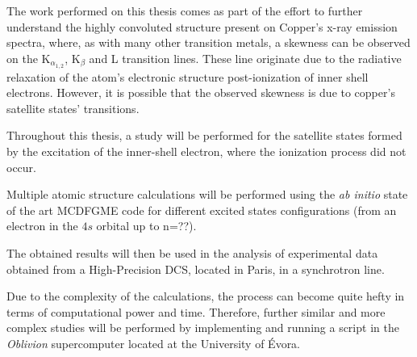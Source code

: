 
%

The work performed on this thesis comes as part of the effort to further understand the highly convoluted structure present on Copper's x-ray emission spectra, where, as with many other transition metals, a skewness can be observed on the K$_{\alpha_{1,2}}$, K$_{\beta}$ and L transition lines. These line originate due to the radiative relaxation of the atom's electronic structure post-ionization of inner shell electrons.
However, it is possible that the observed skewness is due to copper's satellite states' transitions.

Throughout this thesis, a study will be performed for the satellite states formed by the excitation of the inner-shell electron, where the ionization process did not occur.

 Multiple atomic structure calculations will be performed using the \textit{ab initio} state of the art \gls{MCDFGME} code for different excited states configurations (from an electron in the $4s$ orbital up to n=??).

 The obtained results will then be used in the analysis of experimental data obtained from a High-Precision \gls{DCS}, located in Paris, in a synchrotron line.

Due to the complexity of the calculations, the process can become quite hefty in terms of computational power and time. Therefore, further similar and more complex studies will be performed by implementing and running a script in the \textit{Oblivion} supercomputer located at the University of Évora.

